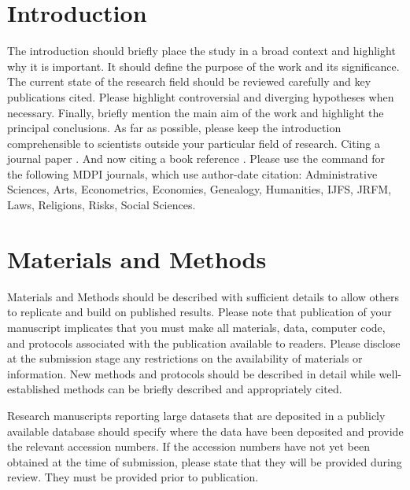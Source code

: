 \documentclass[ijerph,article,accept,moreauthors,pdftex]{mdpi}
\begin{document}

\hypertarget{introduction}{%
\section{Introduction}\label{introduction}}

The introduction should briefly place the study in a broad context and
highlight why it is important. It should define the purpose of the work
and its significance. The current state of the research field should be
reviewed carefully and key publications cited. Please highlight
controversial and diverging hypotheses when necessary. Finally, briefly
mention the main aim of the work and highlight the principal
conclusions. As far as possible, please keep the introduction
comprehensible to scientists outside your particular field of research.
Citing a journal paper
\citep{bertrand-krajewski_distribution_1998, leutnant_stormwater_2016}.
And now citing a book reference \citet{gujer_systems_2008}. Please use
the command \citep{leutnant_stormwater_2016} for the following MDPI
journals, which use author-date citation: Administrative Sciences, Arts,
Econometrics, Economies, Genealogy, Humanities, IJFS, JRFM, Laws,
Religions, Risks, Social Sciences.

\hypertarget{materials-and-methods}{%
\section{Materials and Methods}\label{materials-and-methods}}

Materials and Methods should be described with sufficient details to
allow others to replicate and build on published results. Please note
that publication of your manuscript implicates that you must make all
materials, data, computer code, and protocols associated with the
publication available to readers. Please disclose at the submission
stage any restrictions on the availability of materials or information.
New methods and protocols should be described in detail while
well-established methods can be briefly described and appropriately
cited.

Research manuscripts reporting large datasets that are deposited in a
publicly available database should specify where the data have been
deposited and provide the relevant accession numbers. If the accession
numbers have not yet been obtained at the time of submission, please
state that they will be provided during review. They must be provided
prior to publication.
\end{document}

